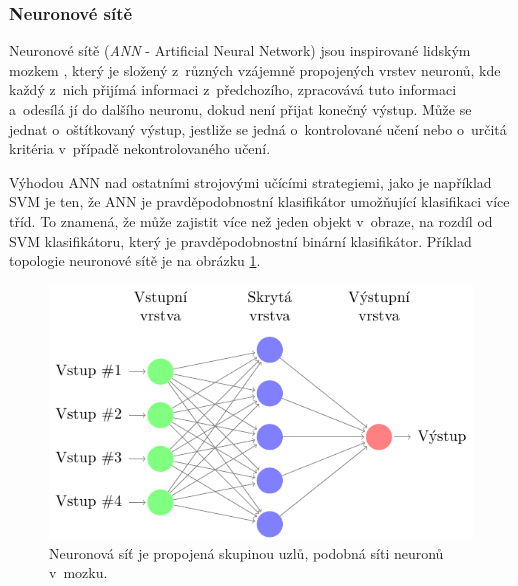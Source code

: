 \subsubsection*{Neuronové sítě}
Neuronové sítě (\textit{ANN} - Artificial Neural Network) jsou inspirované lidským mozkem \cite{ann}, který je složený z~různých vzájemně propojených vrstev neuronů, kde každý z~nich přijímá informaci z~předchozího, zpracovává tuto informaci a~odesílá jí do dalšího neuronu, dokud není přijat konečný výstup. Může se jednat o~oštítkovaný výstup, jestliže se jedná o~kontrolované učení nebo o~určitá kritéria v~případě nekontrolovaného učení.

Výhodou ANN nad ostatními strojovými učícími strategiemi, jako je například SVM je ten, že ANN je pravděpodobnostní klasifikátor umožňující klasifikaci více tříd. To znamená, že může zajistit více než jeden objekt v~obraze, na rozdíl od SVM klasifikátoru, který je pravděpodobnostní binární klasifikátor. Příklad topologie neuronové sítě je na obrázku \ref{fig:ann}. 
\begin{figure}[H]
\centering
\includegraphics[width=.87\linewidth]{figures/ann.pdf}
\caption{Neuronová síť je propojená skupinou uzlů, podobná síti neuronů v~mozku.}
\label{fig:ann}
\end{figure}

